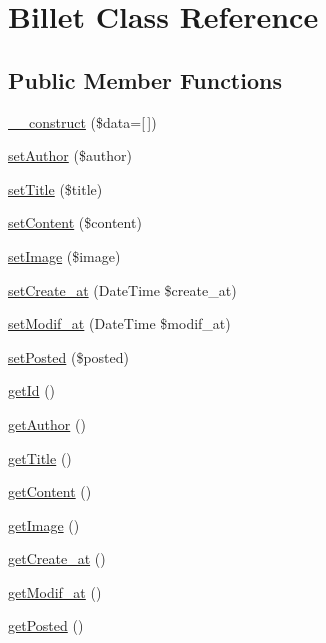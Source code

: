 \hypertarget{class_src_1_1_entity_1_1_billet}{}\section{Billet Class Reference}
\label{class_src_1_1_entity_1_1_billet}
\subsection*{Public Member Functions}
\begin{DoxyCompactItemize}
\item 
\hyperlink{class_src_1_1_entity_1_1_billet_ab3129f1d71e9f51353de9d551ea381d7}{\+\_\+\+\_\+construct} (\$data=\mbox{[}$\,$\mbox{]})
\item 
\hyperlink{class_src_1_1_entity_1_1_billet_afde85a369fc83b442db3cf5c6ac31d4a}{set\+Author} (\$author)
\item 
\hyperlink{class_src_1_1_entity_1_1_billet_a884ba9bb0d54bde7839e798db7964476}{set\+Title} (\$title)
\item 
\hyperlink{class_src_1_1_entity_1_1_billet_a04a5eddb7c3abc7bf31fa25b58f046bf}{set\+Content} (\$content)
\item 
\hyperlink{class_src_1_1_entity_1_1_billet_af785d0fb8da1ba24ec74c2f9f7e27c0a}{set\+Image} (\$image)
\item 
\hyperlink{class_src_1_1_entity_1_1_billet_ad12db04fd7abd82e8172ebee19c45ff1}{set\+Create\+\_\+at} (Date\+Time \$create\+\_\+at)
\item 
\hyperlink{class_src_1_1_entity_1_1_billet_a9f9f5983de6ae197176a80f55f113a6c}{set\+Modif\+\_\+at} (Date\+Time \$modif\+\_\+at)
\item 
\hyperlink{class_src_1_1_entity_1_1_billet_acee4aedcde0f95ac298a1a0ce86be082}{set\+Posted} (\$posted)
\item 
\hyperlink{class_src_1_1_entity_1_1_billet_a12251d0c022e9e21c137a105ff683f13}{get\+Id} ()
\item 
\hyperlink{class_src_1_1_entity_1_1_billet_a5286e30390ae3e1b274940286493dd24}{get\+Author} ()
\item 
\hyperlink{class_src_1_1_entity_1_1_billet_a95e859a4588a39a1824b717378a84c29}{get\+Title} ()
\item 
\hyperlink{class_src_1_1_entity_1_1_billet_a58e43f09a06ce4e29b192c4e17ce7915}{get\+Content} ()
\item 
\hyperlink{class_src_1_1_entity_1_1_billet_a2af8add37797384585cae101fb8cbfe7}{get\+Image} ()
\item 
\hyperlink{class_src_1_1_entity_1_1_billet_ae5e6c0bedcef3f514100c20ee92c901a}{get\+Create\+\_\+at} ()
\item 
\hyperlink{class_src_1_1_entity_1_1_billet_a5858386cc69be9863ed37e0ceb2697b1}{get\+Modif\+\_\+at} ()
\item 
\hyperlink{class_src_1_1_entity_1_1_billet_a4a91b6f2e5d3d9220ccbed241e1d2eb0}{get\+Posted} ()
\end{DoxyCompactItemize}


